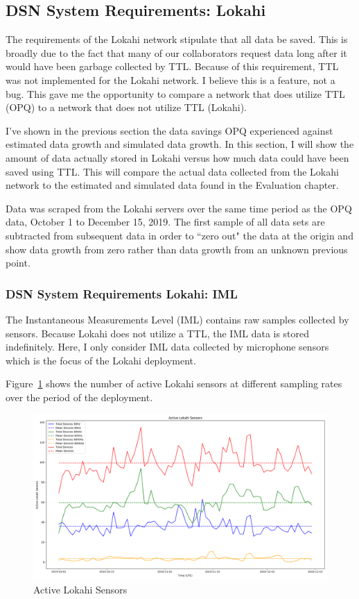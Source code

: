\subsection{DSN System Requirements: Lokahi}\label{subsec:dsn-system-requirements:-lokahi}

The requirements of the Lokahi network stipulate that all data be saved. This is broadly due to the fact that many of our collaborators request data long after it would have been garbage collected by TTL. Because of this requirement, TTL was not implemented for the Lokahi network. I believe this is a feature, not a bug. This gave me the opportunity to compare a network that does utilize TTL (OPQ) to a network that does not utilize TTL (Lokahi).

I've shown in the previous section the data savings OPQ experienced against estimated data growth and simulated data growth. In this section, I will show the amount of data actually stored in Lokahi versus how much data could have been saved using TTL. This will compare the actual data collected from the Lokahi network to the estimated and simulated data found in the Evaluation chapter.

Data was scraped from the Lokahi servers over the same time period as the OPQ data, October 1 to December 15, 2019. The first sample of all data sets are subtracted from subsequent data in order to ``zero out" the data at the origin and show data growth from zero rather than data growth from an unknown previous point.

\subsubsection{DSN System Requirements Lokahi: IML}

The Instantaneous Measurements Level (IML) contains raw samples collected by sensors. Because Lokahi does not utilize a TTL, the IML data is stored indefinitely. Here, I only consider IML data collected by microphone sensors which is the focus of the Lokahi deployment.

Figure~\ref{fig:active_lokahi_sensors} shows the number of active Lokahi sensors at different sampling rates over the period of the deployment.

\begin{figure}[H]
    \centering
    \includegraphics[width=\linewidth]{figures/lokahi_num_sensors.png}
    \caption{Active Lokahi Sensors}
    \label{fig:active_lokahi_sensors}
\end{figure}

